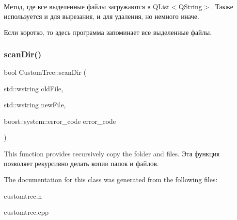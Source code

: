 Метод, где все выделенные файлы загружаются в Q\+List$<$\+Q\+String$>$. Также используется и для вырезания, и для удаления, но немного иначе. 

Если коротко, то здесь программа запоминает все выделенные файлы. \mbox{\label{class_custom_tree_a373ba76bdc9886cd2e997d5af84a0cba}} 
\subsubsection{\texorpdfstring{scan\+Dir()}{scanDir()}}
{\footnotesize\ttfamily bool Custom\+Tree\+::scan\+Dir (\begin{DoxyParamCaption}\item[{std\+::wstring}]{old\+File,  }\item[{std\+::wstring}]{new\+File,  }\item[{boost\+::system\+::error\+\_\+code}]{error\+\_\+code }\end{DoxyParamCaption})}

This function provides recursively copy the folder and files. Эта функция позволяет рекурсивно делать копии папок и файлов. 

The documentation for this class was generated from the following files\+:\begin{DoxyCompactItemize}
\item 
customtree.\+h\item 
customtree.\+cpp\end{DoxyCompactItemize}
